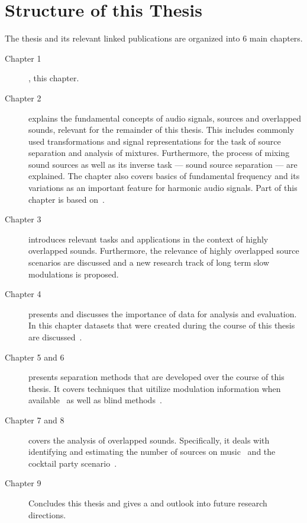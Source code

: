 \section{Structure of this Thesis}

The thesis and its relevant linked publications are organized into 6 main chapters.
\begin{description}
  \item[Chapter 1], this chapter.
  \item[Chapter 2] explains the fundamental concepts of audio signals, sources and overlapped sounds, relevant for the remainder of this thesis. This includes commonly used transformations and signal representations for the task of source separation and analysis of mixtures.
  Furthermore, the process of mixing sound sources as well as its inverse task --- sound source separation --- are explained.
  The chapter also covers basics of fundamental frequency and its variations as an important feature for harmonic audio signals.
  Part of this chapter is based on~\cite{rafii18}.
  \item[Chapter 3] introduces relevant tasks and applications in the context of highly overlapped sounds.
  Furthermore, the relevance of highly overlapped source scenarios are discussed and a new research track of long term slow modulations is proposed.
  \item[Chapter 4] presents and discusses the importance of data for analysis and evaluation.
  In this chapter datasets that were created during the course of this thesis are discussed~\cite{oss_wice, oss_unison, oss_libricount, liutkus17}.
  \item[Chapter 5 and 6] presents separation methods that are developed over the course of this thesis. It covers techniques that uitilize modulation information when available~\cite{stoeter14, stoeter15acm, stoeter15icassp} as well as blind methods~\cite{stoeter16, liutkus17}.
  \item[Chapter 7 and 8] covers the analysis of overlapped sounds. Specifically, it deals with identifying and estimating the number of sources on music~\cite{schoeffler13, stoeter13} and the cocktail party scenario~\cite{stoeter19, stoeter18}.
  \item[Chapter 9] Concludes this thesis and gives a and outlook into future research directions.
\end{description}
